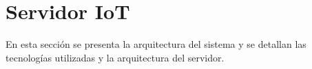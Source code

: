 

\section{Servidor IoT}

En esta sección se presenta la arquitectura del sistema y se detallan las
tecnologías utilizadas y la arquitectura del servidor.






